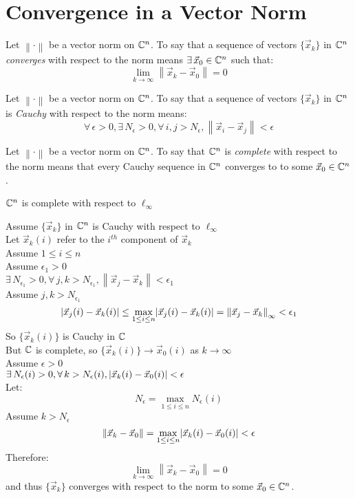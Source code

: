\documentclass[letterpaper,12pt,fleqn]{article}
\newcommand{\norm}[1]{\left\lVert#1\right\rVert}
\newcommand{\nc}{\norm{\cdot}}
\newcommand{\vx}{\vec{x}}
\newcommand{\e}{\epsilon}
\begin{document}
\section*{Convergence in a Vector Norm}

\begin{definition}[Convergence]
  Let $\nc$ be a vector norm on $\mathbb{C}^n$. To say that a sequence of vectors
  $\{\vx_k\}$ in $\mathbb{C}^n$ \emph{converges} with respect to the norm means
  $\exists\,\vx_0\in\C^n$ such that:
  \[\lim_{k\to\infty}\norm{\vx_k-\vx_0}=0\]
\end{definition}

\begin{definition}[Cauchy]
  Let $\nc$ be a vector norm on $\mathbb{C}^n$. To say that a sequence of vectors
  $\{\vx_k\}$ in $\mathbb{C}^n$ is \emph{Cauchy} with respect to the norm means:
  \[\forall\,\e>0,\exists\,N_{\e}>0,\forall\,i,j>N_{\e},\norm{\vx_i-\vx_j}<\e\]
\end{definition}

\begin{definition}[Complete]
  Let $\nc$ be a vector norm on $\mathbb{C}^n$. To say that $\mathbb{C}^n$ is \emph{complete}
  with respect to the norm means that every Cauchy sequence in $\mathbb{C}^n$ converges
  to to some $\vx_0\in\C^n$.
\end{definition}

\begin{theorem}
  $\mathbb{C}^n$ is complete with respect to $\ell_{\infty}$ \\
\end{theorem}

\begin{theproof}
  Assume $\{\vx_k\}$ in $\mathbb{C}^n$ is Cauchy with respect to $\ell_{\infty}$ \\
  Let $\vx_k(i)$ refer to the $i^{th}$ component of $\vx_k$ \\
  Assume $1\le i\le n$ \\
  Assume $\e_1>0$ \\
  $\exists\,N_{\e_1}>0,\forall\,j,k>N_{\e_1},\norm{\vx_j-\vx_k}<\e_1$ \\
  Assume $j,k>N_{\e_1}$
  \[\abs{\vx_j(i)-\vx_k(i)}\le
  \max_{1\le i\le n}\abs{\vx_j(i)-\vx_k(i)}=\norm{\vx_j-\vx_k}_{\infty}<\e_1\]
  So $\{\vx_k(i)\}$ is Cauchy in $\mathbb{C}$ \\
  But $\mathbb{C}$ is complete, so $\{\vx_k(i)\}\to\vx_0(i)$ as $k\to\infty$ \\
  Assume $\e>0$ \\
  $\exists\,N_{\e}(i)>0,\forall\,k>N_{\e}(i),\abs{\vx_k(i)-\vx_0(i)}<\e$ \\
  Let:
  \[N_{\e}=\max_{1\le i\le n}N_{\e}(i)\]
  Assume $k>N_{\e}$
  \[\norm{\vx_k-\vx_0}=\max_{1\le i\le n}\abs{\vx_k(i)-\vx_0(i)}<\e\]
  Therefore:
  \[\lim_{k\to\infty}\norm{\vx_k-\vx_0}=0\]
  and thus $\{\vx_k\}$ converges with respect to the norm to some
  $\vx_0\in\C^n$.
\end{theproof}
\end{document}
